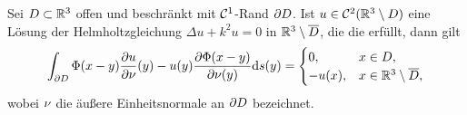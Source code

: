 \begin{thm}\label{theorem: darstellungssatz im äußeren}
	Sei \(D\subset\mathbb{R}^3\) offen und beschränkt mit \(\mathcal{C}^1\)-Rand \(\partial D\). Ist \(u\in\mathcal{C}^2(\mathbb{R}^3\setminus D)\) eine Lösung der Helmholtzgleichung \(\Delta u+k^2u=0\) in \(\mathbb{R}^3\setminus \overline{D}\), die die \SAB erfüllt, dann gilt
	\begin{equation}
		\label{darstellungssatz im äußeren}
		\int_{\partial D}\Phi(x-y)\frac{\partial u}{\partial\nu}(y)-u(y)\frac{\partial\Phi(x-y)}{\partial\nu(y)}\mathrm{d}s(y)=
		\begin{cases}
			0,&x\in D,\\
			-u(x),&x\in\mathbb{R}^3\setminus\overline{D},
		\end{cases}
	\end{equation}
	wobei \(\nu\) die äußere Einheitsnormale an \(\partial D\) bezeichnet.
\end{thm}
